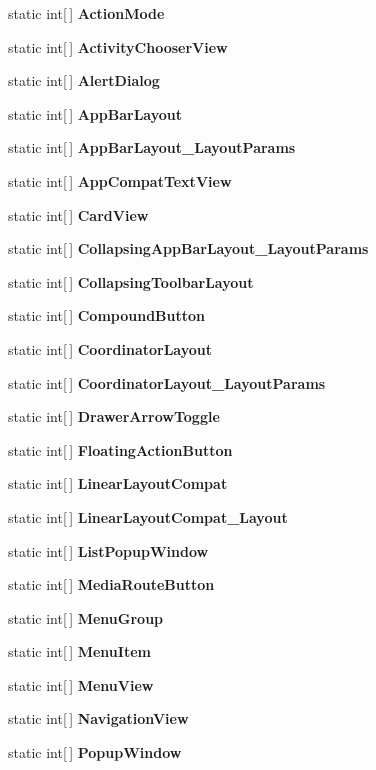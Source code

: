 \begin{DoxyCompactItemize}
\item 
static int\mbox{[}$\,$\mbox{]} {\bfseries Action\+Mode}
\item 
static int\mbox{[}$\,$\mbox{]} {\bfseries Activity\+Chooser\+View}
\item 
static int\mbox{[}$\,$\mbox{]} {\bfseries Alert\+Dialog}
\item 
static int\mbox{[}$\,$\mbox{]} {\bfseries App\+Bar\+Layout}
\item 
static int\mbox{[}$\,$\mbox{]} {\bfseries App\+Bar\+Layout\+\_\+\+Layout\+Params}
\item 
static int\mbox{[}$\,$\mbox{]} {\bfseries App\+Compat\+Text\+View}
\item 
static int\mbox{[}$\,$\mbox{]} {\bfseries Card\+View}
\item 
static int\mbox{[}$\,$\mbox{]} {\bfseries Collapsing\+App\+Bar\+Layout\+\_\+\+Layout\+Params}
\item 
static int\mbox{[}$\,$\mbox{]} {\bfseries Collapsing\+Toolbar\+Layout}
\item 
static int\mbox{[}$\,$\mbox{]} {\bfseries Compound\+Button}
\item 
static int\mbox{[}$\,$\mbox{]} {\bfseries Coordinator\+Layout}
\item 
static int\mbox{[}$\,$\mbox{]} {\bfseries Coordinator\+Layout\+\_\+\+Layout\+Params}
\item 
static int\mbox{[}$\,$\mbox{]} {\bfseries Drawer\+Arrow\+Toggle}
\item 
static int\mbox{[}$\,$\mbox{]} {\bfseries Floating\+Action\+Button}
\item 
static int\mbox{[}$\,$\mbox{]} {\bfseries Linear\+Layout\+Compat}
\item 
static int\mbox{[}$\,$\mbox{]} {\bfseries Linear\+Layout\+Compat\+\_\+\+Layout}
\item 
static int\mbox{[}$\,$\mbox{]} {\bfseries List\+Popup\+Window}
\item 
static int\mbox{[}$\,$\mbox{]} {\bfseries Media\+Route\+Button}
\item 
static int\mbox{[}$\,$\mbox{]} {\bfseries Menu\+Group}
\item 
static int\mbox{[}$\,$\mbox{]} {\bfseries Menu\+Item}
\item 
static int\mbox{[}$\,$\mbox{]} {\bfseries Menu\+View}
\item 
static int\mbox{[}$\,$\mbox{]} {\bfseries Navigation\+View}
\item 
static int\mbox{[}$\,$\mbox{]} {\bfseries Popup\+Window}
\item 

\end{DoxyCompactItemize}
